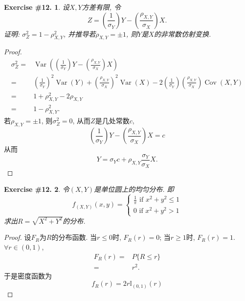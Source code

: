 \documentclass[UTF8, a4paper]{article}
\newtheorem{exercise}{Exercise \#12.}
\begin{document}
\begin{framed}
\begin{exercise}
设\(X,Y\)方差有限, 令
$$
Z=\left(\frac{1}{\sigma_Y}\right) Y-\left(\frac{\rho_{X, Y}}{\sigma_X}\right) X.
$$
证明: \(\sigma_Z^2 = 1- \rho_{X,Y}^2\), 并推导若\(\rho_{X,Y} = \pm 1\), 则\(Y\)是\(X\)的非常数仿射变换.
\end{exercise}
\end{framed}

\begin{proof}
$$
\begin{aligned}
    \sigma_Z^2 =& \operatorname{Var}\left(\left(\frac{1}{\sigma_Y}\right) Y-\left(\frac{\rho_{X, Y}}{\sigma_X}\right) X\right) \\
    =& \left(\frac{1}{\sigma_Y}\right)^2 \operatorname{Var}(Y) + \left(\frac{\rho_{X, Y}}{\sigma_X}\right)^2 \operatorname{Var}(X) - 2\left(\frac{1}{\sigma_Y}\right)\left(\frac{\rho_{X, Y}}{\sigma_X}\right)\operatorname{Cov}(X, Y) \\
    =& 1 + \rho_{X,Y}^2 - 2\rho_{X,Y} \\
    =& 1 - \rho_{X,Y}^2.
\end{aligned}
$$
若\(\rho_{X,Y} = \pm 1\), 则\(\sigma_Z^2 = 0\), 从而\(Z\)是几处常数\(c\), 
$$
\left(\frac{1}{\sigma_Y}\right) Y-\left(\frac{\rho_{X, Y}}{\sigma_X}\right) X = c
$$
从而
$$
Y = \sigma_Y c + \rho_{X,Y}\frac{\sigma_Y}{\sigma_X} X.
$$
\end{proof}



\begin{framed}
\begin{exercise}
令\((X,Y)\)是单位圆上的均匀分布. 即 
$$
f_{(X, Y)}(x, y)=\left\{\begin{array}{l}
\frac{1}{\pi} \text { if } x^2+y^2 \leq 1 \\
0 \text { if } x^2+y^2>1
\end{array}\right.
$$
求出\(R = \sqrt{X^2+Y^2}\)的分布.
\end{exercise}
\end{framed}

\begin{proof}
    设\(F_R\)为\(R\)的分布函数.
当\(r \leq 0\)时, \(F_R(r) = 0\); 当\(r \geq 1\)时, \(F_R(r) = 1\).
\(\forall r \in (0, 1)\),
$$
\begin{aligned}
    F_R(r) =& P\{R \leq r\} \\
    =& r^2.
\end{aligned}
$$
于是密度函数为
$$
f_R(r) = 2r\mathbb{I}_{(0,1)}(r)
$$
\end{proof}
\end{document}
